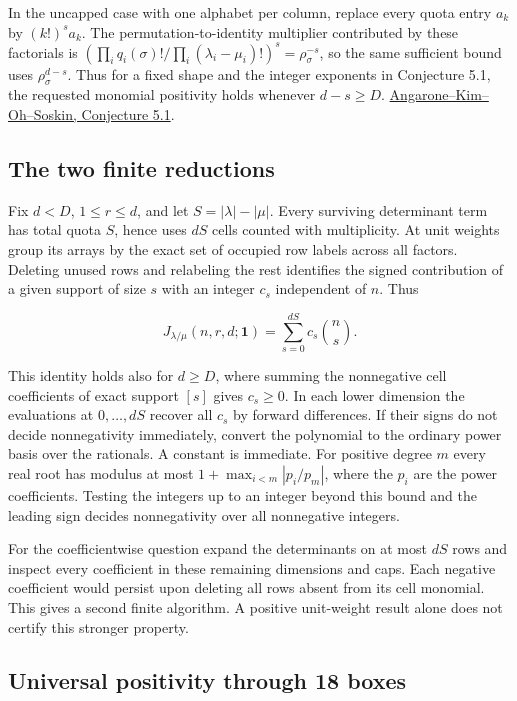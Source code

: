\documentclass[11pt]{article}
\begin{document}
In the uncapped case with one alphabet per column, replace every quota entry $a_k$ by $(k!)^s a_k$. The permutation-to-identity multiplier contributed by these factorials is $(\prod_i q_i(\sigma)!/\prod_i(\lambda_i-\mu_i)!)^s=\rho_\sigma^{-s}$, so the same sufficient bound uses $\rho_\sigma^{d-s}$. Thus for a fixed shape and the integer exponents in Conjecture 5.1, the requested monomial positivity holds whenever $d-s\ge D$. \href{https://arxiv.org/html/2511.08969v1#S5.Thmthm1}{Angarone--Kim--Oh--Soskin, Conjecture 5.1}.

\subsection{The two finite reductions}

Fix $d<D$, $1\le r\le d$, and let $S=|\lambda|-|\mu|$. Every surviving determinant term has total quota $S$, hence uses $dS$ cells counted with multiplicity. At unit weights group its arrays by the exact set of occupied row labels across all factors. Deleting unused rows and relabeling the rest identifies the signed contribution of a given support of size $s$ with an integer $c_s$ independent of $n$. Thus

\begin{equation*}
J_{\lambda/\mu}(n,r,d;\mathbf1)=\sum_{s=0}^{dS}c_s\binom ns.
\end{equation*}

This identity holds also for $d\ge D$, where summing the nonnegative cell coefficients of exact support $[s]$ gives $c_s\ge0$. In each lower dimension the evaluations at $0,\ldots,dS$ recover all $c_s$ by forward differences. If their signs do not decide nonnegativity immediately, convert the polynomial to the ordinary power basis over the rationals. A constant is immediate. For positive degree $m$ every real root has modulus at most $1+\max_{i<m}|p_i/p_m|$, where the $p_i$ are the power coefficients. Testing the integers up to an integer beyond this bound and the leading sign decides nonnegativity over all nonnegative integers.

For the coefficientwise question expand the determinants on at most $dS$ rows and inspect every coefficient in these remaining dimensions and caps. Each negative coefficient would persist upon deleting all rows absent from its cell monomial. This gives a second finite algorithm. A positive unit-weight result alone does not certify this stronger property.

\subsection{Universal positivity through 18 boxes}
\end{document}
